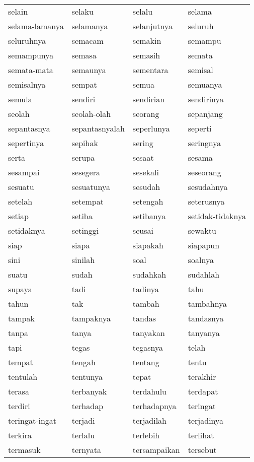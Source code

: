 \begin{tabular}{ | l | l | l | l | }
selain & selaku & selalu & selama\\
selama-lamanya & selamanya & selanjutnya & seluruh\\
seluruhnya & semacam & semakin & semampu\\
semampunya & semasa & semasih & semata\\
semata-mata & semaunya & sementara & semisal\\
semisalnya & sempat & semua & semuanya\\
semula & sendiri & sendirian & sendirinya\\
seolah & seolah-olah & seorang & sepanjang\\
sepantasnya & sepantasnyalah & seperlunya & seperti\\
sepertinya & sepihak & sering & seringnya\\
serta & serupa & sesaat & sesama\\
sesampai & sesegera & sesekali & seseorang\\
sesuatu & sesuatunya & sesudah & sesudahnya\\
setelah & setempat & setengah & seterusnya\\
setiap & setiba & setibanya & setidak-tidaknya\\
setidaknya & setinggi & seusai & sewaktu\\
siap & siapa & siapakah & siapapun\\
sini & sinilah & soal & soalnya\\
suatu & sudah & sudahkah & sudahlah\\
supaya & tadi & tadinya & tahu\\
tahun & tak & tambah & tambahnya\\
tampak & tampaknya & tandas & tandasnya\\
tanpa & tanya & tanyakan & tanyanya\\
tapi & tegas & tegasnya & telah\\
tempat & tengah & tentang & tentu\\
tentulah & tentunya & tepat & terakhir\\
terasa & terbanyak & terdahulu & terdapat\\
terdiri & terhadap & terhadapnya & teringat\\
teringat-ingat & terjadi & terjadilah & terjadinya\\
terkira & terlalu & terlebih & terlihat\\
termasuk & ternyata & tersampaikan & tersebut\\

\end{tabular}
